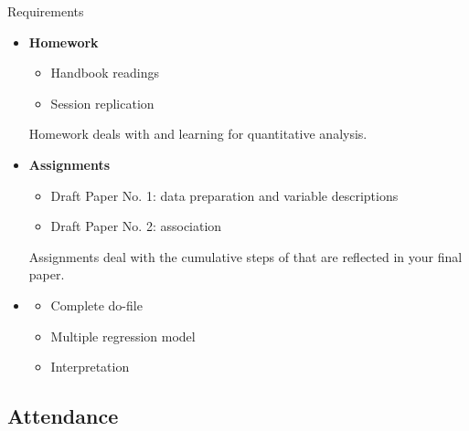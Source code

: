 \documentclass{beamer}
\begin{document}
	\begin{frame}[t]{Requirements}

		\begin{itemize}
			\item \textbf{Homework}
			\begin{itemize}
				\item Handbook readings
				\item Session replication
			\end{itemize}
			Homework deals with  and learning  for quantitative analysis.
			\item \textbf{Assignments}
			\begin{itemize}
				\item Draft Paper No. 1: data preparation and variable descriptions
				\item Draft Paper No. 2: association
			\end{itemize}
			Assignments deal with the cumulative steps of  that are reflected in your final paper.
			\item {}
			\begin{itemize}
				\item Complete do-file
				\item Multiple regression model
				\item Interpretation
			\end{itemize}
		\end{itemize}	
	\end{frame}

	\subsection{Attendance}
\end{document}
